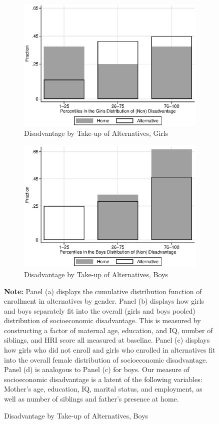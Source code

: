 \begin{figure}
\begin{subfigure}[h]{0.4\textwidth}
\end{subfigure}
\begin{subfigure}[h]{0.4\textwidth}
	\centering
	\caption{Disadvantage by Take-up of Alternatives, Girls} \label{figure:disadgirls}
	\includegraphics[width=\textwidth]{output/factorbase_wgirlscompare}
\end{subfigure}%
\begin{subfigure}[h]{0.4\textwidth}
	\centering
	\caption{Disadvantage by Take-up of Alternatives, Boys} \label{figure:disadboys}
	\includegraphics[width=\textwidth]{output/factorbase_wboyscompare}
\end{subfigure}
\footnotesize
\justify
\textbf{Note:} Panel (a) displays the cumulative distribution function of enrollment in alternatives by gender. Panel (b) displays how girls and boys separately fit into the overall (girls and boys pooled) distribution of socioeconomic disadvantage. This is measured by constructing a factor of maternal age, education, and IQ, number of siblings, and HRI score all measured at baseline. Panel (c) displays how girls who did not enroll and girls who enrolled in alternatives fit into the overall female distribution of socioeconomic disadvantage. Panel (d) is analogous to Panel (c) for boys. Our measure of socioeconomic disadvantage is a latent of the following variables: Mother's age, education, IQ, marital status, and employment, as well as number of siblings and father's presence at home.

\end{figure}
